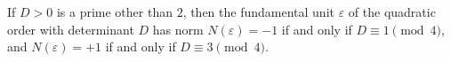 If $D > 0$ is a prime other than $2$, then the fundamental unit $\varepsilon$ of the quadratic order with determinant $D$ has norm $N(\varepsilon) = -1$ if and only if $D \equiv 1 \pmod{4}$, and $N(\varepsilon) = +1$ if and only if $D \equiv 3 \pmod{4}$.
